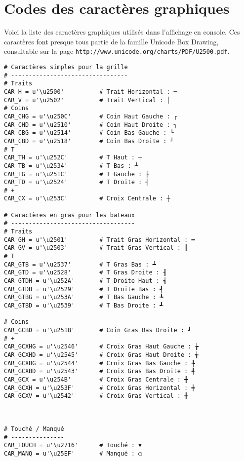 \chapter{Codes des caractères graphiques}\label{annexe_codescar}

Voici la liste des caractères graphiques utilisés dans l'affichage en console. Ces caractères font presque tous partie de la famille Unicode Box Drawing, consultable sur la page \texttt{http://www.unicode.org/charts/PDF/U2500.pdf}.

\begin{verbatim}
# Caractères simples pour la grille
# ---------------------------------
# Traits
CAR_H = u'\u2500'          # Trait Horizontal : ─
CAR_V = u'\u2502'          # Trait Vertical : │
# Coins
CAR_CHG = u'\u250C'        # Coin Haut Gauche : ┌
CAR_CHD = u'\u2510'        # Coin Haut Droite : ┐
CAR_CBG = u'\u2514'        # Coin Bas Gauche : └
CAR_CBD = u'\u2518'        # Coin Bas Droite : ┘
# T
CAR_TH = u'\u252C'         # T Haut : ┬
CAR_TB = u'\u2534'         # T Bas : ┴
CAR_TG = u'\u251C'         # T Gauche : ├
CAR_TD = u'\u2524'         # T Droite : ┤
# +
CAR_CX = u'\u253C'         # Croix Centrale : ┼

# Caractères en gras pour les bateaux
# -----------------------------------
# Traits
CAR_GH = u'\u2501'         # Trait Gras Horizontal : ━
CAR_GV = u'\u2503'         # Trait Gras Vertical : ┃
# T
CAR_GTB = u'\u2537'        # T Gras Bas : ┷
CAR_GTD = u'\u2528'        # T Gras Droite : ┨
CAR_GTDH = u'\u252A'       # T Droite Haut : ┪
CAR_GTDB = u'\u2529'       # T Droite Bas : ┩
CAR_GTBG = u'\u253A'       # T Bas Gauche : ┺
CAR_GTBD = u'\u2539'       # T Bas Droite : ┹

# Coins
CAR_GCBD = u'\u251B'       # Coin Gras Bas Droite : ┛
# +
CAR_GCXHG = u'\u2546'      # Croix Gras Haut Gauche : ╆
CAR_GCXHD = u'\u2545'      # Croix Gras Haut Droite : ╅
CAR_GCXBG = u'\u2544'      # Croix Gras Bas Gauche : ╄
CAR_GCXBD = u'\u2543'      # Croix Gras Bas Droite : ╃
CAR_GCX = u'\u254B'        # Croix Gras Centrale : ╋
CAR_GCXH = u'\u253F'       # Croix Gras Horizontal : ┿
CAR_GCXV = u'\u2542'       # Croix Gras Vertical : ╂



# Touché / Manqué
# ---------------
CAR_TOUCH = u'\u2716'      # Touché : ✖
CAR_MANQ = u'\u25EF'       # Manqué : ◯
\end{verbatim}
